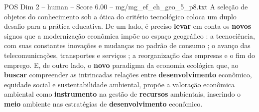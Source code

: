 \begin{textsample}{POS Dim 2 – human – Score 6.00 – mg/mg\_ef\_ch\_geo\_5\_p8.txt}  \label{ex:f2_pos_020}
A seleção de objetos do conhecimento sob a ótica do critério tecnológico coloca um duplo desafio para a prática educativa.
De um lado, é preciso \textbf{levar} em conta os \textbf{novos} signos que a modernização econômica impõe ao espaço geográfico : a tecnociência, com suas constantes inovações e mudanças no padrão de consumo ; o avanço das telecomunicações, transportes e serviços ; a reorganização das empresas e o fim do emprego.
E, de outro lado, o \textbf{novo} paradigma da economia ecológica que, ao \textbf{buscar} compreender as intrincadas relações entre \textbf{desenvolvimento} econômico, equidade social e sustentabilidade ambiental, propõe a valoração econômica ambiental como \textbf{instrumento} na gestão de \textbf{recursos} ambientais, inserindo o \textbf{meio} ambiente nas estratégias de \textbf{desenvolvimento} econômico.

\end{textsample}
